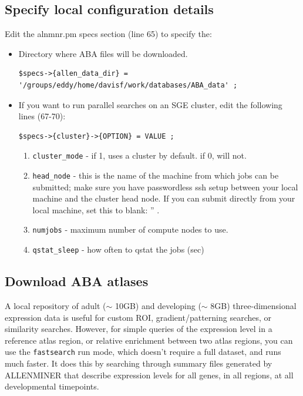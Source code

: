 \documentclass[10pt]{article}
\begin{document}
\subsection{Specify local configuration details}

Edit the alnmnr.pm specs section (line 65) to specify the:
\begin{itemize}
   \item Directory where ABA files will be downloaded.
\lstset{breaklines=true,language=bash,breakatwhitespace=true}
\lstset{frame=single}
\lstset{basicstyle=\ttfamily}
\begin{lstlisting}
$specs->{allen_data_dir} = '/groups/eddy/home/davisf/work/databases/ABA_data' ;
\end{lstlisting}

   \item If you want to run parallel searches on an SGE cluster, edit the following lines (67-70):
\lstset{breaklines=true,language=bash,breakatwhitespace=true}
\lstset{frame=single}
\lstset{basicstyle=\ttfamily}
\begin{lstlisting}
$specs->{cluster}->{OPTION} = VALUE ;
\end{lstlisting}

\begin{enumerate}
   \item {\tt cluster\_mode} - if 1, uses a cluster by default. if 0, will not.
   \item {\tt head\_node} - this is the name of the machine from which jobs can be submitted; make sure you have passwordless ssh setup between your local machine and the cluster head node. If you can submit directly from your local machine, set this to blank: '' .
   \item {\tt numjobs} - maximum number of compute nodes to use.
   \item {\tt qstat\_sleep} - how often to qstat the jobs (sec)
\end{enumerate}
\end{itemize}

\subsection{Download ABA atlases}

A local repository of adult ($\sim$ 10GB) and developing ($\sim$ 8GB) three-dimensional expression data is useful for custom ROI, gradient/patterning searches, or similarity searches. However, for simple queries of the expression level in a reference atlas region, or relative enrichment between two atlas regions, you can use the {\tt fastsearch} run mode, which doesn't require a full dataset, and runs much faster. It does this by searching through summary files generated by ALLENMINER that describe expression levels for all genes, in all regions, at all developmental timepoints.\\
\end{document}

